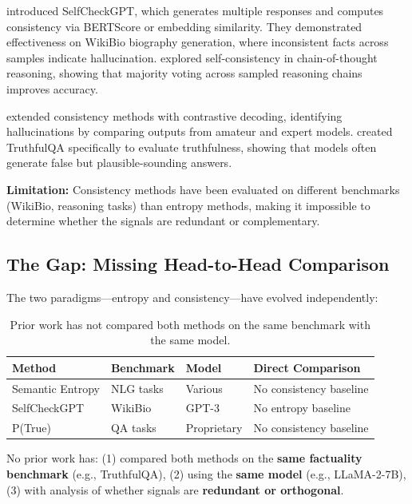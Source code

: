 \citet{manakul2023selfcheckgpt} introduced SelfCheckGPT, which generates multiple responses and computes consistency via BERTScore or embedding similarity. They demonstrated effectiveness on WikiBio biography generation, where inconsistent facts across samples indicate hallucination. \citet{wang2023selfconsistency} explored self-consistency in chain-of-thought reasoning, showing that majority voting across sampled reasoning chains improves accuracy.

\citet{chen2024contrastive} extended consistency methods with contrastive decoding, identifying hallucinations by comparing outputs from amateur and expert models. \citet{lin2022truthfulqa} created TruthfulQA specifically to evaluate truthfulness, showing that models often generate false but plausible-sounding answers.

\textbf{Limitation:} Consistency methods have been evaluated on different benchmarks (WikiBio, reasoning tasks) than entropy methods, making it impossible to determine whether the signals are redundant or complementary.

\subsection{The Gap: Missing Head-to-Head Comparison}

The two paradigms---entropy and consistency---have evolved independently:

\begin{table}[h]
\centering
\begin{tabular}{@{}llll@{}}
\toprule
\textbf{Method} & \textbf{Benchmark} & \textbf{Model} & \textbf{Direct Comparison} \\
\midrule
Semantic Entropy \citep{kuhn2023semantic} & NLG tasks & Various & No consistency baseline \\
SelfCheckGPT \citep{manakul2023selfcheckgpt} & WikiBio & GPT-3 & No entropy baseline \\
P(True) \citep{kadavath2022language} & QA tasks & Proprietary & No consistency baseline \\
\bottomrule
\end{tabular}
\caption{Prior work has not compared both methods on the same benchmark with the same model.}
\label{tab:gap}
\end{table}

No prior work has: (1) compared both methods on the \textbf{same factuality benchmark} (e.g., TruthfulQA), (2) using the \textbf{same model} (e.g., LLaMA-2-7B), (3) with analysis of whether signals are \textbf{redundant or orthogonal}.

